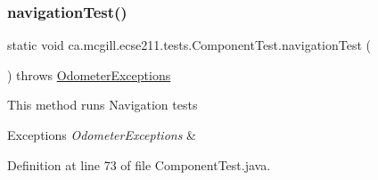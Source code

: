 \subsubsection{\texorpdfstring{navigation\+Test()}{navigationTest()}}
{\footnotesize\ttfamily static void ca.\+mcgill.\+ecse211.\+tests.\+Component\+Test.\+navigation\+Test (\begin{DoxyParamCaption}{ }\end{DoxyParamCaption}) throws \hyperlink{classca_1_1mcgill_1_1ecse211_1_1odometer_1_1_odometer_exceptions}{Odometer\+Exceptions}\hspace{0.3cm}{\ttfamily [static]}}

This method runs Navigation tests


\begin{DoxyExceptions}{Exceptions}
{\em Odometer\+Exceptions} & \\
\hline
\end{DoxyExceptions}


Definition at line 73 of file Component\+Test.\+java.


